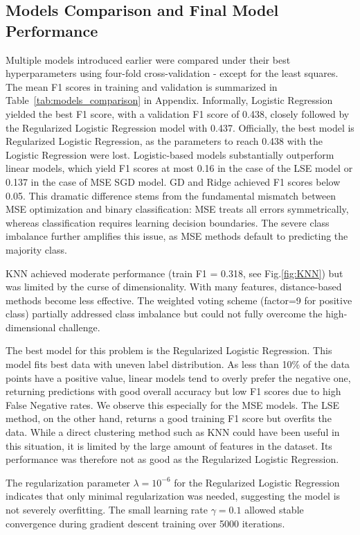 \documentclass[10pt,conference,compsocconf]{IEEEtran}
\begin{document}
\subsection{Models Comparison and Final Model Performance}
Multiple models introduced earlier were compared under their best hyperparameters using four-fold cross-validation - except for the least squares. The mean F1 scores in training and validation is  summarized in Table~\ref{tab:models_comparison} in Appendix.  Informally, Logistic Regression yielded the best F1 score, with a validation F1 score of 0.438, closely followed by the Regularized Logistic Regression model with 0.437. Officially, the best model is Regularized Logistic Regression, as the parameters to reach 0.438 with the Logistic Regression were lost. Logistic-based models substantially outperform linear models, which yield F1 scores at most 0.16 in the case of the LSE model or 0.137 in the case of MSE SGD model. 
GD and Ridge achieved F1 scores below 0.05. This dramatic difference stems from the fundamental mismatch between MSE optimization and binary classification: MSE treats all errors symmetrically, whereas classification requires learning decision boundaries. The severe class imbalance further amplifies this issue, as MSE methods default to predicting the majority class.

KNN achieved moderate performance (train F1 = 0.318, see Fig.\ref{fig:KNN}) but was limited by the curse of dimensionality. With many features, distance-based methods become less effective. The weighted voting scheme (factor=9 for positive class) partially addressed class imbalance but could not fully overcome the high-dimensional challenge.

The best model for this problem is the Regularized Logistic Regression. This model fits best data with uneven label distribution. As less than 10\% of the data points have a positive value, linear models tend to overly prefer the negative one, returning predictions with good overall accuracy but low F1 scores due to high False Negative rates. We observe this especially for the MSE models. The LSE method, on the other hand, returns a good training F1 score but overfits the data. While a direct clustering method such as KNN could have been useful in this situation, it is limited by the large amount of features in the dataset. Its performance was therefore not as good as the Regularized Logistic Regression.

The regularization parameter $\lambda=10^{-6}$ for the Regularized Logistic Regression indicates that only minimal regularization was needed, suggesting the model is not severely overfitting. The small learning rate $\gamma=0.1$ allowed stable convergence during gradient descent training over 5000 iterations.
\end{document}
